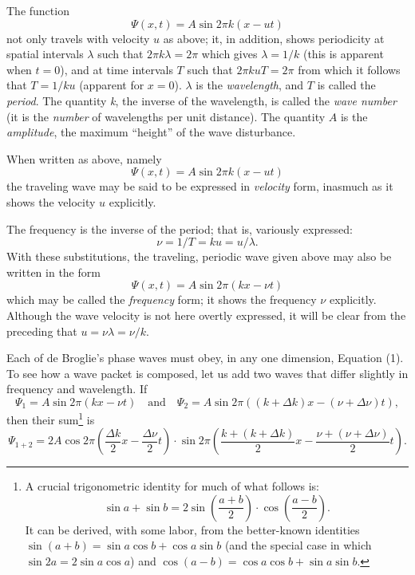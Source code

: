 The function
\begin{equation*}
\Psi(x,t) = A \sin 2\pi k(x-ut)
\end{equation*}
not only travels with velocity $u$ as above; it, in addition, shows
periodicity at spatial intervals $\lambda$ such that $2\pi k\lambda = 2\pi$ 
which gives $\lambda = 1/k$ (this is apparent when
$t = 0$), and at time intervals $T$ such that $2\pi kuT = 2\pi$ 
from which it follows that $T = 1/ku$ (apparent
for $x = 0$). $\lambda$ is the \emph{wavelength}, and $T$ is
called the \emph{period}. The quantity \emph{k}, the inverse of
the wavelength, is called the \emph{wave number} (it is the
\emph{number} of wavelengths per unit distance). The quantity $A$
is the \emph{amplitude}, the maximum ``height'' of the wave disturbance.

When written as above, namely
\begin{equation*}
\Psi(x,t) = A \sin 2\pi k(x-ut)
\end{equation*}
the traveling wave may be said to be expressed in \emph{velocity} form,
inasmuch as it shows the velocity $u$ explicitly.

The frequency is the inverse of the period; that is, variously
expressed:
\begin{equation*}
\nu = 1/T = ku = u/\lambda .
\end{equation*}
With these substitutions, the traveling, periodic wave given above may
also be written in the form
\begin{equation*}\tag{1}
\Psi(x,t) = A \sin 2\pi(kx-\nu t)
\end{equation*}
which may be called the \emph{frequency} form; it shows the frequency
$\nu$ explicitly. Although the wave velocity is not here overtly
expressed, it will be clear from the preceding that $u = \nu\lambda = \nu/k$.

Each of de Broglie's phase waves must obey, in any one dimension,
Equation (1). To see how a wave packet is composed, let us add two waves
that differ slightly in frequency and wavelength. If
\begin{equation*}
\Psi_1  = A\sin 2\pi(kx-\nu t)\quad\text{and}\quad\Psi_2 = 
A\sin 2\pi((k+\Delta k)x - (\nu + \Delta\nu)t),
\end{equation*}
then their sum\footnote{A crucial trigonometric identity for much of
  what follows is: 
  \begin{equation*}
  \sin a + \sin b = 2 \sin\left(\frac{a+b}{2}\right)\cdot\cos\left(\frac{a-b}{2}\right).
  \end{equation*}
  It can be derived, with some labor, from the better-known identities $\sin{(a+b)} = 
  \sin a\cos b + \cos a\sin b$
  (and the special case in which $\sin{2a} = 2\sin{a}\cos{a}$) and
  $\cos{(a-b)} = \cos{a}\cos{b} + \sin{a}\sin{b}$.} is
\begin{equation*}
\Psi_{1+2} = 2A\cos 2\pi\left(\frac{\Delta k}{2}x - \frac{\Delta\nu}{2}t\right)
\cdot \sin 2\pi\left(\frac{k+(k+\Delta k)}{2}x - \frac{\nu+(\nu+ \Delta\nu)}{2}t\right).
\end{equation*}


